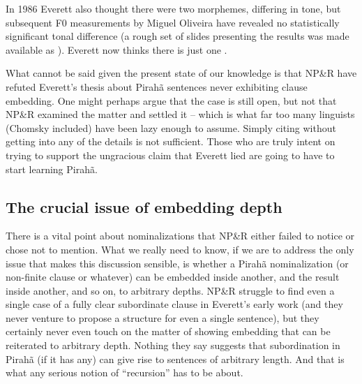 \documentclass[output=paper,colorlinks,citecolor=brown
]{langscibook}
\begin{document}
In 1986 Everett also thought there were two \mbox{}
morphemes, differing in tone, but subsequent F0 measurements by Miguel
Oliveira have revealed no statistically significant tonal difference
(a rough set of slides presenting the results was made available as
\citealt{OlivEver10}). Everett now thinks there is just one
\mbox{}.

What cannot be said given the present state of our knowledge is that
NP\&R have refuted Everett's thesis about Pirah{\~a} sentences never
exhibiting clause embedding. One might perhaps argue that the case
is still open, but not that NP\&R examined the matter and settled it
-- which is what far too many linguists (Chomsky included) have been
lazy enough to assume. Simply citing \citet{NevPesRod09a} without
getting into any of the details is not sufficient. Those who are truly
intent on trying to support the ungracious claim that Everett lied
are going to have to start learning Pirah{\~a}.

\subsection{The crucial issue of embedding depth}

There is a vital point about nominalizations that NP\&R either failed
to notice or chose not to mention. What we really need to know, if we
are to address the only issue that makes this discussion sensible, is
whether a Pirah{\~a} nominalization (or non-finite clause or whatever)
can be embedded inside another, and the result inside another, and so
on, to arbitrary depths. NP\&R struggle to find even a single case of
a fully clear subordinate clause in Everett's early work (and they
never venture to propose a structure for even a single sentence), but
they certainly never even touch on the matter of showing embedding that
can be reiterated to arbitrary depth. Nothing they say suggests that
subordination in Pirah{\~a} (if it has any) can give rise to sentences
of arbitrary length. And that is what any serious notion of ``recursion''
has to be about.
\end{document}
